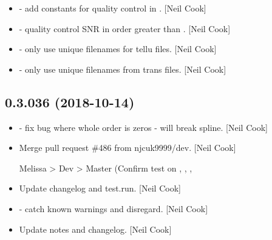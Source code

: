 \documentclass[a4paper,10pt,english]{report}
\begin{document}
\begin{itemize}
\item {} 
 - add constants for quality control in
. {[}Neil Cook{]}

\item {} 
 - quality control SNR in order 
greater than . {[}Neil Cook{]}

\item {} 
 - only use unique filenames for tellu files. {[}Neil
Cook{]}

\item {} 
 - only use unique filenames from trans files. {[}Neil
Cook{]}

\end{itemize}


\subsection{0.3.036 (2018-10-14)}
\label{\detokenize{misc/changelog:id296}}\begin{itemize}
\item {} 
  - fix bug where whole order is zeros - will break
spline. {[}Neil Cook{]}

\item {} 
Merge pull request \#486 from njcuk9999/dev. {[}Neil Cook{]}

Melissa \textendash{}\textgreater{} Dev \textendash{}\textgreater{} Master (Confirm test on , , , 

\item {} 
Update changelog and test.run. {[}Neil Cook{]}

\item {} 
 - catch known warnings and disregard. {[}Neil Cook{]}

\item {} 
Update notes and changelog. {[}Neil Cook{]}

\end{itemize}
\end{document}
